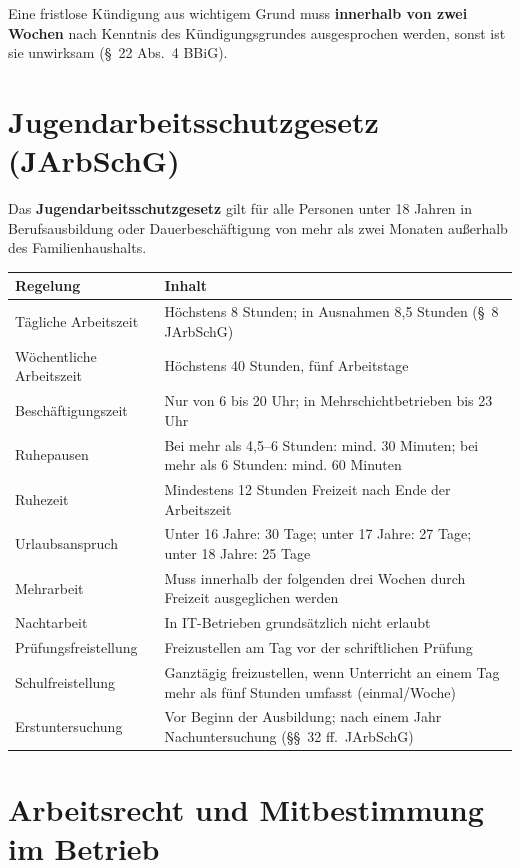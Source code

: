 \documentclass[11pt, a4paper]{article}
\begin{document}
\begin{merksatz}
Eine fristlose Kündigung aus wichtigem Grund muss \textbf{innerhalb von zwei Wochen} nach
Kenntnis des Kündigungsgrundes ausgesprochen werden, sonst ist sie unwirksam (§~22
Abs.~4 BBiG).
\end{merksatz}

\section{Jugendarbeitsschutzgesetz (JArbSchG)}

Das \textbf{Jugendarbeitsschutzgesetz} gilt für alle Personen unter 18 Jahren in
Berufsausbildung oder Dauerbeschäftigung von mehr als zwei Monaten außerhalb des
Familienhaushalts.

\begin{center}
\begin{tabular}{p{4cm} p{9cm}}
\toprule
\textbf{Regelung} & \textbf{Inhalt}\\
\midrule
Tägliche Arbeitszeit & Höchstens 8 Stunden; in Ausnahmen 8{,}5 Stunden (§~8 JArbSchG)\\
Wöchentliche Arbeitszeit & Höchstens 40 Stunden, fünf Arbeitstage\\
Beschäftigungszeit & Nur von 6 bis 20 Uhr; in Mehrschichtbetrieben bis 23 Uhr\\
Ruhepausen & Bei mehr als 4{,}5–6 Stunden: mind. 30 Minuten; bei mehr als 6 Stunden: mind. 60 Minuten\\
Ruhezeit & Mindestens 12 Stunden Freizeit nach Ende der Arbeitszeit\\
Urlaubsanspruch & Unter 16 Jahre: 30 Tage; unter 17 Jahre: 27 Tage; unter 18 Jahre: 25 Tage\\
Mehrarbeit & Muss innerhalb der folgenden drei Wochen durch Freizeit ausgeglichen werden\\
Nachtarbeit & In IT-Betrieben grundsätzlich nicht erlaubt\\
Prüfungsfreistellung & Freizustellen am Tag vor der schriftlichen Prüfung\\
Schulfreistellung & Ganztägig freizustellen, wenn Unterricht an einem Tag mehr als fünf Stunden umfasst (einmal/Woche)\\
Erstuntersuchung & Vor Beginn der Ausbildung; nach einem Jahr Nachuntersuchung (§§~32 ff.~JArbSchG)\\
\bottomrule
\end{tabular}
\end{center}

\section{Arbeitsrecht und Mitbestimmung im Betrieb}
\end{document}

